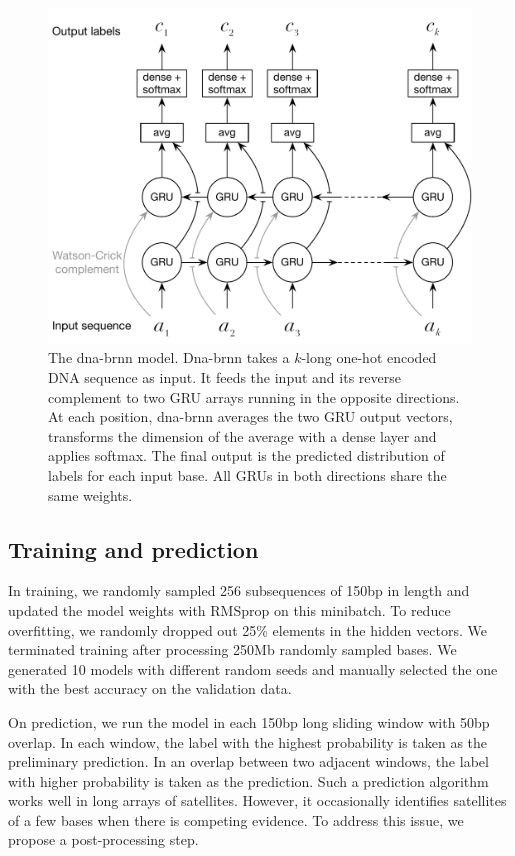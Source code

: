 \documentclass{bioinfo}
\begin{document}
\begin{methods}
\begin{figure}[tb]
\centering
\includegraphics[width=.45\textwidth]{dna-nn-fig}
\caption{The dna-brnn model. Dna-brnn takes a $k$-long one-hot encoded DNA
sequence as input. It feeds the input and its reverse complement to two GRU
arrays running in the opposite directions. At each
position, dna-brnn averages the two GRU output vectors, transforms the
dimension of the average with a dense layer and applies softmax. The final
output is the predicted distribution of labels for each input base. All GRUs in
both directions share the same weights.}\label{fig:model}
\end{figure}

\subsection{Training and prediction}

In training, we randomly sampled 256 subsequences of 150bp in length and updated
the model weights with RMSprop on this minibatch. To reduce overfitting, we
randomly dropped out 25\% elements in the hidden vectors. We terminated
training after processing 250Mb randomly sampled bases. We generated 10 models
with different random seeds and manually selected the one with the best accuracy on the
validation data.

On prediction, we run the model in each 150bp long sliding window with 50bp
overlap. In each window, the label with the highest probability is taken as the
preliminary prediction. In an overlap between two adjacent windows, the label
with higher probability is taken as the prediction. Such a prediction
algorithm works well in long arrays of satellites. However, it occasionally
identifies satellites of a few bases when there is competing evidence. To
address this issue, we propose a post-processing step.


\end{methods}
\end{document}
